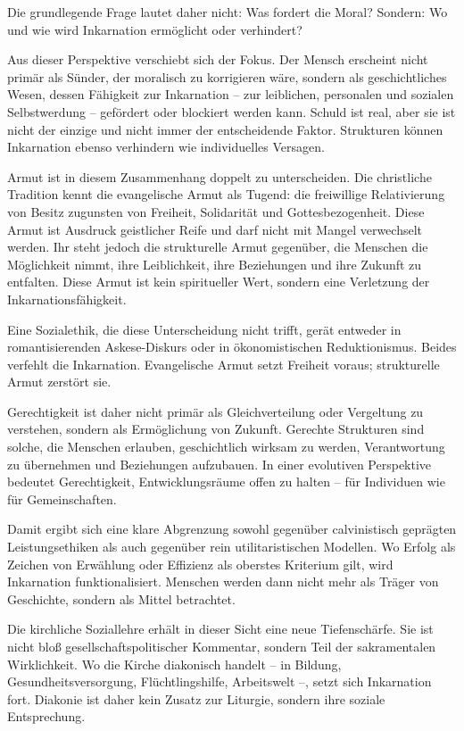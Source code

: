 \documentclass[
  ngerman,
]{article}
\begin{document}
Die grundlegende Frage lautet daher nicht: Was fordert die Moral?
Sondern: Wo und wie wird Inkarnation ermöglicht oder verhindert?

Aus dieser Perspektive verschiebt sich der Fokus. Der Mensch erscheint
nicht primär als Sünder, der moralisch zu korrigieren wäre, sondern als
geschichtliches Wesen, dessen Fähigkeit zur Inkarnation -- zur
leiblichen, personalen und sozialen Selbstwerdung -- gefördert oder
blockiert werden kann. Schuld ist real, aber sie ist nicht der einzige
und nicht immer der entscheidende Faktor. Strukturen können Inkarnation
ebenso verhindern wie individuelles Versagen.

Armut ist in diesem Zusammenhang doppelt zu unterscheiden. Die
christliche Tradition kennt die evangelische Armut als Tugend: die
freiwillige Relativierung von Besitz zugunsten von Freiheit, Solidarität
und Gottesbezogenheit. Diese Armut ist Ausdruck geistlicher Reife und
darf nicht mit Mangel verwechselt werden. Ihr steht jedoch die
strukturelle Armut gegenüber, die Menschen die Möglichkeit nimmt, ihre
Leiblichkeit, ihre Beziehungen und ihre Zukunft zu entfalten. Diese
Armut ist kein spiritueller Wert, sondern eine Verletzung der
Inkarnationsfähigkeit.

Eine Sozialethik, die diese Unterscheidung nicht trifft, gerät entweder
in romantisierenden Askese-Diskurs oder in ökonomistischen
Reduktionismus. Beides verfehlt die Inkarnation. Evangelische Armut
setzt Freiheit voraus; strukturelle Armut zerstört sie.

Gerechtigkeit ist daher nicht primär als Gleichverteilung oder
Vergeltung zu verstehen, sondern als Ermöglichung von Zukunft. Gerechte
Strukturen sind solche, die Menschen erlauben, geschichtlich wirksam zu
werden, Verantwortung zu übernehmen und Beziehungen aufzubauen. In einer
evolutiven Perspektive bedeutet Gerechtigkeit, Entwicklungsräume offen
zu halten -- für Individuen wie für Gemeinschaften.

Damit ergibt sich eine klare Abgrenzung sowohl gegenüber calvinistisch
geprägten Leistungsethiken als auch gegenüber rein utilitaristischen
Modellen. Wo Erfolg als Zeichen von Erwählung oder Effizienz als
oberstes Kriterium gilt, wird Inkarnation funktionalisiert. Menschen
werden dann nicht mehr als Träger von Geschichte, sondern als Mittel
betrachtet.

Die kirchliche Soziallehre erhält in dieser Sicht eine neue
Tiefenschärfe. Sie ist nicht bloß gesellschaftspolitischer Kommentar,
sondern Teil der sakramentalen Wirklichkeit. Wo die Kirche diakonisch
handelt -- in Bildung, Gesundheitsversorgung, Flüchtlingshilfe,
Arbeitswelt --, setzt sich Inkarnation fort. Diakonie ist daher kein
Zusatz zur Liturgie, sondern ihre soziale Entsprechung.
\end{document}
